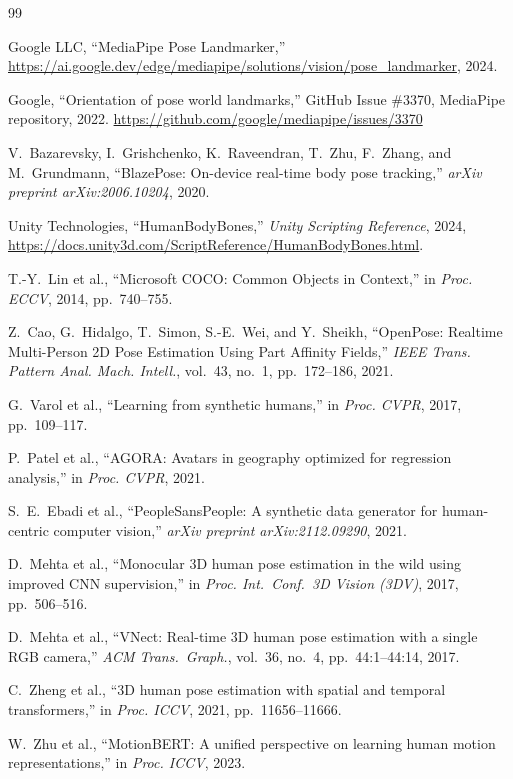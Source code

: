 \documentclass[twocolumn]{article}
\begin{document}
\begin{thebibliography}{99}

Google LLC, ``MediaPipe Pose Landmarker,''
\url{https://ai.google.dev/edge/mediapipe/solutions/vision/pose_landmarker},
2024.

Google, ``Orientation of pose world landmarks,''
GitHub Issue \#3370, MediaPipe repository, 2022.
\url{https://github.com/google/mediapipe/issues/3370}

V.~Bazarevsky, I.~Grishchenko, K.~Raveendran, T.~Zhu, F.~Zhang,
and M.~Grundmann,
``BlazePose: On-device real-time body pose tracking,''
\textit{arXiv preprint arXiv:2006.10204}, 2020.

Unity Technologies, ``HumanBodyBones,''
\textit{Unity Scripting Reference}, 2024,
\url{https://docs.unity3d.com/ScriptReference/HumanBodyBones.html}.

T.-Y.~Lin et al.,
``Microsoft COCO: Common Objects in Context,''
in \textit{Proc. ECCV}, 2014, pp.~740--755.

Z.~Cao, G.~Hidalgo, T.~Simon, S.-E.~Wei, and Y.~Sheikh,
``OpenPose: Realtime Multi-Person 2D Pose Estimation Using Part Affinity
Fields,''
\textit{IEEE Trans. Pattern Anal. Mach. Intell.}, vol.~43, no.~1,
pp.~172--186, 2021.

G.~Varol et al.,
``Learning from synthetic humans,''
in \textit{Proc. CVPR}, 2017, pp.~109--117.

P.~Patel et al.,
``AGORA: Avatars in geography optimized for regression analysis,''
in \textit{Proc. CVPR}, 2021.

S.~E.~Ebadi et al.,
``PeopleSansPeople: A synthetic data generator for human-centric
computer vision,''
\textit{arXiv preprint arXiv:2112.09290}, 2021.

D.~Mehta et al.,
``Monocular 3D human pose estimation in the wild using improved CNN
supervision,''
in \textit{Proc. Int.\ Conf.\ 3D Vision (3DV)}, 2017, pp.~506--516.

D.~Mehta et al.,
``VNect: Real-time 3D human pose estimation with a single RGB camera,''
\textit{ACM Trans.\ Graph.}, vol.~36, no.~4, pp.~44:1--44:14, 2017.

C.~Zheng et al.,
``3D human pose estimation with spatial and temporal transformers,''
in \textit{Proc. ICCV}, 2021, pp.~11656--11666.

W.~Zhu et al.,
``MotionBERT: A unified perspective on learning human motion
representations,''
in \textit{Proc. ICCV}, 2023.

\end{thebibliography}
\end{document}

